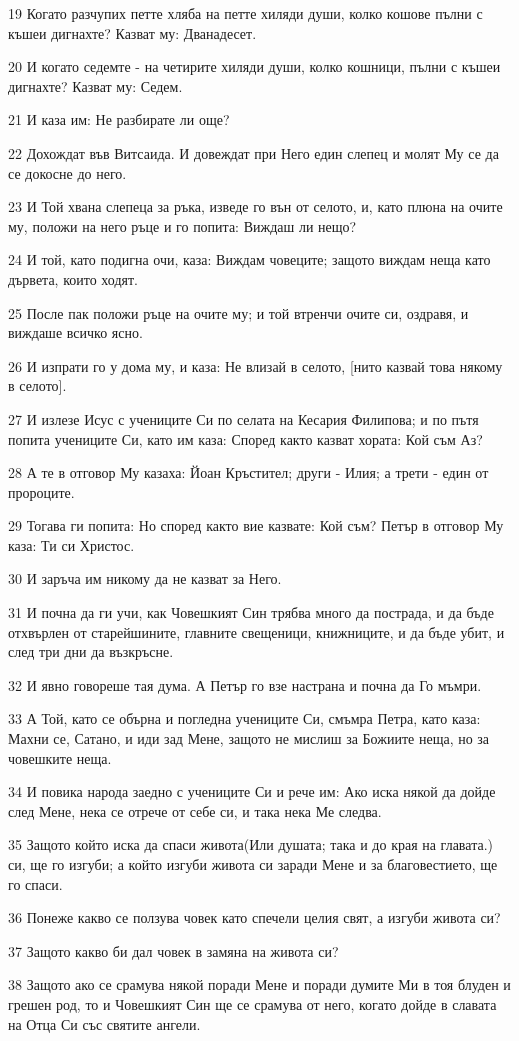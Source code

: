 \par 19 Когато разчупих петте хляба на петте хиляди души, колко кошове пълни с къшеи дигнахте? Казват му: Дванадесет.
\par 20 И когато седемте - на четирите хиляди души, колко кошници, пълни с къшеи дигнахте? Казват му: Седем.
\par 21 И каза им: Не разбирате ли още?
\par 22 Дохождат във Витсаида. И довеждат при Него един слепец и молят Му се да се докосне до него.
\par 23 И Той хвана слепеца за ръка, изведе го вън от селото, и, като плюна на очите му, положи на него ръце и го попита: Виждаш ли нещо?
\par 24 И той, като подигна очи, каза: Виждам човеците; защото виждам неща като дървета, които ходят.
\par 25 После пак положи ръце на очите му; и той втренчи очите си, оздравя, и виждаше всичко ясно.
\par 26 И изпрати го у дома му, и каза: Не влизай в селото, [нито казвай това някому в селото].
\par 27 И излезе Исус с учениците Си по селата на Кесария Филипова; и по пътя попита учениците Си, като им каза: Според както казват хората: Кой съм Аз?
\par 28 А те в отговор Му казаха: Йоан Кръстител; други - Илия; а трети - един от пророците.
\par 29 Тогава ги попита: Но според както вие казвате: Кой съм? Петър в отговор Му каза: Ти си Христос.
\par 30 И заръча им никому да не казват за Него.
\par 31 И почна да ги учи, как Човешкият Син трябва много да пострада, и да бъде отхвърлен от старейшините, главните свещеници, книжниците, и да бъде убит, и след три дни да възкръсне.
\par 32 И явно говореше тая дума. А Петър го взе настрана и почна да Го мъмри.
\par 33 А Той, като се обърна и погледна учениците Си, смъмра Петра, като каза: Махни се, Сатано, и иди зад Мене, защото не мислиш за Божиите неща, но за човешките неща.
\par 34 И повика народа заедно с учениците Си и рече им: Ако иска някой да дойде след Мене, нека се отрече от себе си, и така нека Ме следва.
\par 35 Защото който иска да спаси живота(Или душата; така и до края на главата.) си, ще го изгуби; а който изгуби живота си заради Мене и за благовестието, ще го спаси.
\par 36 Понеже какво се ползува човек като спечели целия свят, а изгуби живота си?
\par 37 Защото какво би дал човек в замяна на живота си?
\par 38 Защото ако се срамува някой поради Мене и поради думите Ми в тоя блуден и грешен род, то и Човешкият Син ще се срамува от него, когато дойде в славата на Отца Си със святите ангели.


